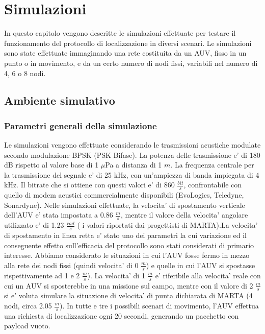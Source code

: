 \chapter{Simulazioni}
In questo capitolo vengono descritte le simulazioni effettuate per testare il funzionamento del protocollo di localizzazione in diversi scenari. \newline Le simulazioni sono state effettuate immaginando una rete costituita da un AUV, fisso in un punto o in movimento, e da un certo numero di nodi fissi, variabili nel numero di 4, 6 o 8 nodi.

\section{Ambiente simulativo}

\subsection{Parametri generali della simulazione}
\par
Le simulazioni vengono effettuate considerando le trasmissioni acustiche modulate secondo modulazione BPSK (PSK Bifase). La potenza delle trasmissione e' di 180 dB rispetto al valore base di 1 $\mu$Pa a distanza di 1 $m$. La frequenza centrale per la trasmissione del segnale e' di 25 kHz, con un'ampiezza di banda impiegata di 4 kHz. Il bitrate che si ottiene con questi valori e' di 860 $\frac{bit}{s}$, confrontabile con quello di modem acustici commercialmente disponibili (EvoLogics, Teledyne, Sonardyne).
Nelle simulazioni effettuate, la velocita' di spostamento verticale dell'AUV e' stata impostata a 0.86 \(\frac{m}{s}\), mentre il valore della velocita' angolare utilizzato e' di 1.23 \(\frac{rad}{s}\) ( i valori riportati dai progettisti di MARTA).\newline La velocita' di spostamento in linea retta e' stato uno dei parametri la cui variazione ed il conseguente effetto sull'efficacia del protocollo sono stati considerati di primario interesse. Abbiamo considerato le situazioni in cui l'AUV fosse fermo in mezzo alla rete dei nodi fissi (quindi velocita' di 0 \(\frac{m}{s}\)) e quelle in cui l'AUV si spostasse rispettivamente ad 1 e 2 \(\frac{m}{s}\)). La velocita' di 1 $\frac{m}{s}$ e' riferibile alla velocita' reale con cui un AUV si sposterebbe in una missione sul campo, mentre con il valore di 2 $\frac{m}{s}$ si e' voluta simulare la situazione di velocita' di punta dichiarata di MARTA (4 nodi, circa 2.05 $\frac{m}{s}$). In tutte e tre i possibili scenari di movimento, l'AUV effettua una richiesta di localizzazione ogni 20 secondi, generando un pacchetto con payload vuoto.
